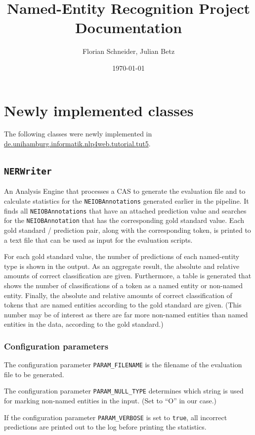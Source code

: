 \documentclass[11pt, english]{article}
\title{Named-Entity Recognition Project\\Documentation}
\author{Florian Schneider, Julian Betz}
\date{\today}
\begin{document}
\maketitle

\pagestyle{mainmatter}

\section{Newly implemented classes}
\label{sec:Classes}
The following classes were newly implemented in \url{de.unihamburg.informatik.nlp4web.tutorial.tut5}.

\subsection{\texttt{NERWriter}}
An Analysis Engine that processes a CAS to generate the evaluation file and to calculate statistics for the \verb/NEIOBAnnotations/ generated earlier in the pipeline.
It finds all \verb/NEIOBAnnotations/ that have an attached prediction value and searches for the \verb/NEIOBAnnotation/ that has the corresponding gold standard value.
Each gold standard / prediction pair, along with the corresponding token, is printed to a text file that can be used as input for the evaluation scripts.

For each gold standard value, the number of predictions of each named-entity type is shown in the output.
As an aggregate result, the absolute and relative amounts of correct classification are given.
Furthermore, a table is generated that shows the number of classifications of a token as a named entity or non-named entity.
Finally, the absolute and relative amounts of correct classification of tokens that are named entities according to the gold standard are given.
(This number may be of interest as there are far more non-named entities than named entities in the data, according to the gold standard.)

\subsubsection{Configuration parameters}
The configuration parameter \verb/PARAM_FILENAME/ is the filename of the evaluation file to be generated.

The configuration parameter \verb/PARAM_NULL_TYPE/ determines which string is used for marking non-named entities in the input.
(Set to ``O'' in our case.)

If the configuration parameter \verb/PARAM_VERBOSE/ is set to \verb/true/, all incorrect predictions are printed out to the log before printing the statistics.
\end{document}

